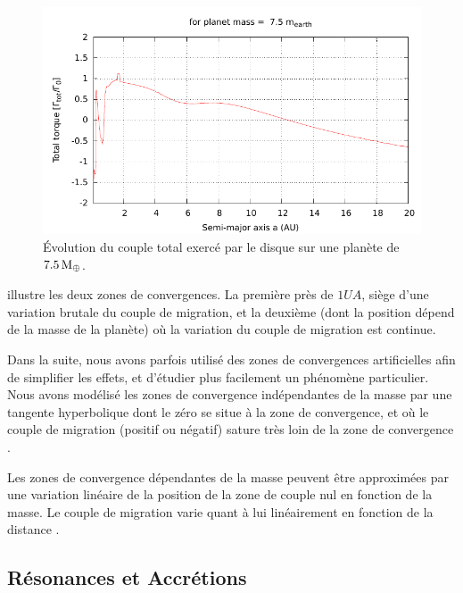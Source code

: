 \begin{figure}[htb]
\centering
\includegraphics[width=0.75\linewidth]{figure/total_torque_fixed_m.pdf}
\caption{Évolution du couple total exercé par le disque sur une planète de $7.5\mathrm{\thinspace M_\oplus}$. }\label{fig:total_torque_fixed_m}
\end{figure}

 illustre les deux zones de convergences. La première près de $1\unit{UA}$, siège d'une variation brutale du couple de migration, et la deuxième (dont la position dépend de la masse de la planète) où la variation du couple de migration est continue. 

Dans la suite, nous avons parfois utilisé des zones de convergences artificielles afin de simplifier les effets, et d'étudier plus facilement un phénomène particulier. Nous avons modélisé les zones de convergence indépendantes de la masse par une tangente hyperbolique dont le zéro se situe à la zone de convergence, et où le couple de migration (positif ou négatif) sature très loin de la zone de convergence . 

Les zones de convergence dépendantes de la masse peuvent être approximées par une variation linéaire de la position de la zone de couple nul en fonction de la masse. Le couple de migration varie quant à lui linéairement en fonction de la distance . 


\subsection{Résonances et Accrétions}

